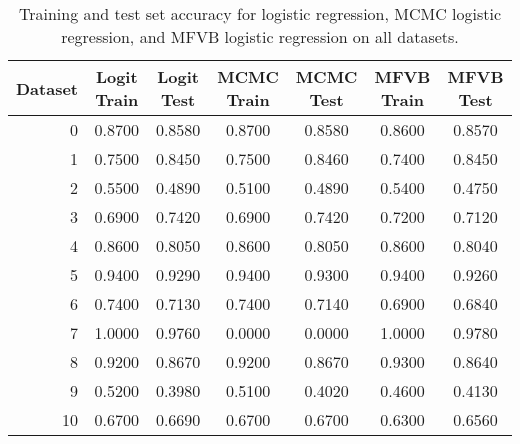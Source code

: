 \begin{table}[tb]
\centering
\begin{tabular}{rcccccc}
  \toprule
 {\bf  Dataset} & {\bf  Logit Train} & {\bf  Logit Test} & {\bf  MCMC Train} & {\bf  MCMC Test} & {\bf  MFVB Train} & {\bf  MFVB Test}\\
  \midrule
  0 & 0.8700 & 0.8580 & 0.8700 & 0.8580 & 0.8600 & 0.8570 \\
  1 & 0.7500 & 0.8450 & 0.7500 & 0.8460 & 0.7400 & 0.8450 \\
  2 & 0.5500 & 0.4890 & 0.5100 & 0.4890 & 0.5400 & 0.4750 \\
  3 & 0.6900 & 0.7420 & 0.6900 & 0.7420 & 0.7200 & 0.7120 \\
  4 & 0.8600 & 0.8050 & 0.8600 & 0.8050 & 0.8600 & 0.8040 \\
  5 & 0.9400 & 0.9290 & 0.9400 & 0.9300 & 0.9400 & 0.9260 \\
  6 & 0.7400 & 0.7130 & 0.7400 & 0.7140 & 0.6900 & 0.6840 \\
  7 & 1.0000 & 0.9760 & 0.0000 & 0.0000 & 1.0000 & 0.9780 \\
  8 & 0.9200 & 0.8670 & 0.9200 & 0.8670 & 0.9300 & 0.8640 \\
  9 & 0.5200 & 0.3980 & 0.5100 & 0.4020 & 0.4600 & 0.4130 \\
  10 & 0.6700 & 0.6690 & 0.6700 & 0.6700 & 0.6300 & 0.6560 \\
  \bottomrule
\end{tabular}
\caption{Training and test set accuracy for logistic regression, MCMC logistic regression, and MFVB logistic regression on all datasets.}\label{tab:all_acc}
\end{table}
